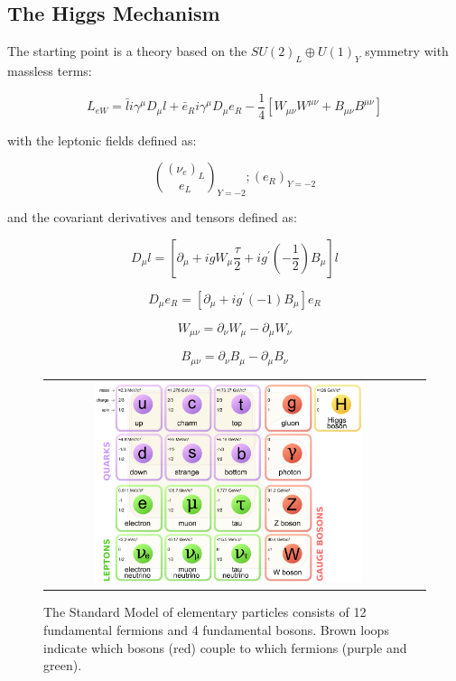 \subsection{The Higgs Mechanism}

The starting point is a theory based on the $SU(2)_{L} \oplus U(1)_{Y}$ symmetry with massless terms:

\begin{equation}
L_{eW} = \bar{l}i\gamma^{\mu} D_{\mu}l + \bar{e}_{R}i\gamma^{\mu}D_{\mu}e_{R} − \dfrac{1}{4}[W_{\mu\nu}W^{\mu\nu} +B_{\mu\nu}B^{\mu\nu}]
\end{equation}

with the leptonic fields defined as:

\begin{equation}
\binom{(\nu_{e})_{L}}{e_{L}}_{Y=−2} ; (e_{R})_{Y=−2}
\end{equation}

and the covariant derivatives and tensors defined as:

\begin{equation}
D_{\mu}l = [\partial_{\mu} + igW_{\mu} \dfrac{\tau}{2}  + ig^{\prime}(-\dfrac{1}{2})B_{\mu}]l 
\end{equation}

\begin{equation}
D_{\mu}e_{R} = [\partial_{\mu} + ig^{\prime}(-1)B_{\mu}]e_{R}
\end{equation}

\begin{equation}
W_{\mu\nu} =\partial_{\nu}W_{\mu}−\partial_{\mu}W_{\nu} 
\end{equation}

\begin{equation}
B_{\mu\nu} =\partial_{\nu}B_{\mu}−\partial_{\mu}B_{\nu} 
\end{equation}


\begin{figure}[tbh!]
	\centering
	
	\begin{tabular}{cc}
		\includegraphics[width=0.75\textwidth]{theory/pics/SM_particles.png}
	\end{tabular}
	\caption{The Standard Model of elementary particles consists of  12 fundamental fermions and 4 fundamental bosons. Brown loops indicate which bosons (red) couple to which fermions (purple and green).}
	\label{fig:SM_particles}
\end{figure}

